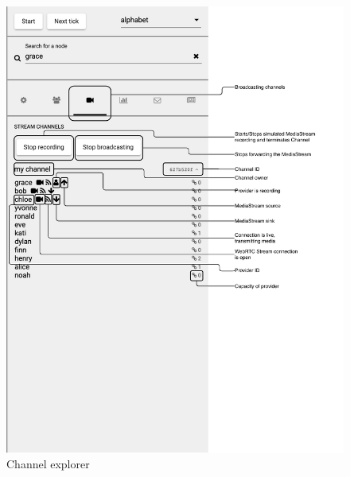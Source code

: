 \begin{figure}
\centering
\includegraphics[width=1\textwidth]{graphics/analysis-tools/visualisation-sidebar-channel-explorer.pdf}
\caption{Channel explorer}
\label{fig:anl-sim-channel-explorer}
\end{figure}

